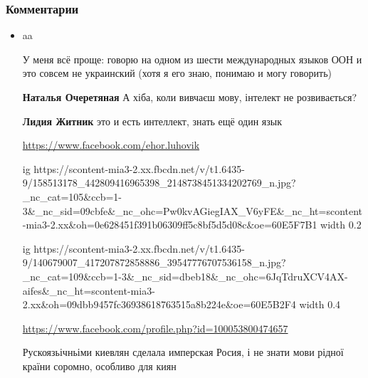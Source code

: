  
 
 
 
 
\clearpage
\subsubsection{Комментарии}
\label{sec:18_06_2020.fb.zharkih_ekaterina.1.mova_jazyk.cmt}

\begin{itemize}
\item aa

\par
У меня всё проще: говорю на одном из шести международных языков ООН и это совсем не украинский (хотя я его знаю, понимаю и могу говорить)

\par
\textbf{Наталья Очеретяная} А хіба, коли вивчаєш мову, інтелект не розвивається?

\par
\textbf{Лидия Житник} это и есть интеллект, знать ещё один язык

\par
\url{https://www.facebook.com/ehor.luhovik}\par
\ifcmt
  ig https://scontent-mia3-2.xx.fbcdn.net/v/t1.6435-9/158513178_442809416965398_2148738451334202769_n.jpg?_nc_cat=105&ccb=1-3&_nc_sid=09cbfe&_nc_ohc=Pw0kvAGiegIAX_V6yFE&_nc_ht=scontent-mia3-2.xx&oh=0e628451f391b06309ff5c8bf5d5d08c&oe=60E5F7B1
  width 0.2
\fi

\ifcmt
  ig https://scontent-mia3-2.xx.fbcdn.net/v/t1.6435-9/140679007_417207872858886_39547776707536158_n.jpg?_nc_cat=109&ccb=1-3&_nc_sid=dbeb18&_nc_ohc=6JqTdruXCV4AX-aifes&_nc_ht=scontent-mia3-2.xx&oh=09dbb9457fc36938618763515a8b224e&oe=60E5B2F4
  width 0.4
\fi

\par
\url{https://www.facebook.com/profile.php?id=100053800474657}\par

Рускоязьічньіми киевлян сделала имперская Росия, і не знати мови рідної країни
соромно, особливо для киян


\end{itemize}
